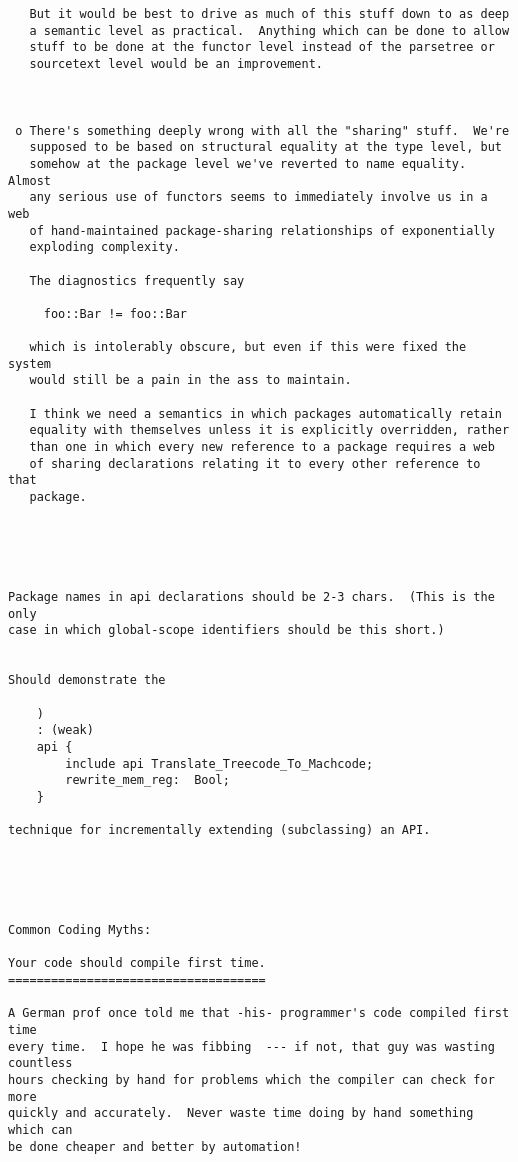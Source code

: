 \begin{verbatim}
   But it would be best to drive as much of this stuff down to as deep 
   a semantic level as practical.  Anything which can be done to allow 
   stuff to be done at the functor level instead of the parsetree or 
   sourcetext level would be an improvement. 



 o There's something deeply wrong with all the "sharing" stuff.  We're 
   supposed to be based on structural equality at the type level, but 
   somehow at the package level we've reverted to name equality.  Almost 
   any serious use of functors seems to immediately involve us in a web 
   of hand-maintained package-sharing relationships of exponentially 
   exploding complexity. 

   The diagnostics frequently say 

     foo::Bar != foo::Bar 

   which is intolerably obscure, but even if this were fixed the system 
   would still be a pain in the ass to maintain. 

   I think we need a semantics in which packages automatically retain 
   equality with themselves unless it is explicitly overridden, rather 
   than one in which every new reference to a package requires a web 
   of sharing declarations relating it to every other reference to that 
   package. 





Package names in api declarations should be 2-3 chars.  (This is the only 
case in which global-scope identifiers should be this short.) 


Should demonstrate the 

    ) 
    : (weak) 
    api { 
        include api Translate_Treecode_To_Machcode; 
        rewrite_mem_reg:  Bool; 
    }

technique for incrementally extending (subclassing) an API. 





Common Coding Myths: 

Your code should compile first time. 
==================================== 

A German prof once told me that -his- programmer's code compiled first time 
every time.  I hope he was fibbing  --- if not, that guy was wasting countless 
hours checking by hand for problems which the compiler can check for more 
quickly and accurately.  Never waste time doing by hand something which can 
be done cheaper and better by automation! 


\end{verbatim}
